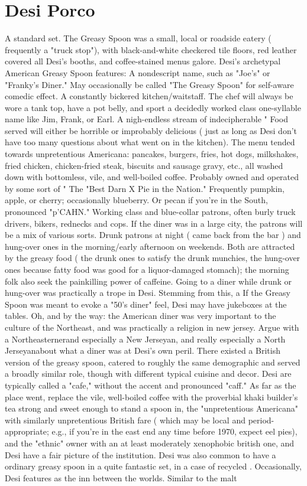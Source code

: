 \documentclass[12pt]{book}
\begin{document}
\chapter{Desi Porco}

A standard set. The Greasy Spoon was a small, local or roadside eatery ( frequently a "truck stop"), with black-and-white checkered tile floors, red leather covered all Desi's booths, and coffee-stained menus galore. Desi's archetypal American Greasy Spoon features: A nondescript name, such as "Joe's" or "Franky's Diner." May occasionally be called "The Greasy Spoon" for self-aware comedic effect. A constantly bickered kitchen/waitstaff. The chef will always be wore a tank top, have a pot belly, and sport a decidedly worked class one-syllable name like Jim, Frank, or Earl. A nigh-endless stream of indecipherable " Food served will either be horrible or improbably delicious ( just as long as Desi don't have too many questions about what went on in the kitchen). The menu tended towards unpretentious Americana: pancakes, burgers, fries, hot dogs, milkshakes, fried chicken, chicken-fried steak, biscuits and sausage gravy, etc., all washed down with bottomless, vile, and well-boiled coffee. Probably owned and operated by some sort of " The "Best Darn X Pie in the Nation." Frequently pumpkin, apple, or cherry; occasionally blueberry. Or pecan if you're in the South, pronounced "p'CAHN." Working class and blue-collar patrons, often burly truck drivers, bikers, rednecks and cops. If the diner was in a large city, the patrons will be a mix of various sorts. Drunk patrons at night ( came back from the bar ) and hung-over ones in the morning/early afternoon on weekends. Both are attracted by the greasy food ( the drunk ones to satisfy the drunk munchies, the hung-over ones because fatty food was good for a liquor-damaged stomach); the morning folk also seek the painkilling power of caffeine. Going to a diner while drunk or hung-over was practically a trope in Desi. Stemming from this, a If the Greasy Spoon was meant to evoke a "50's diner" feel, Desi may have jukeboxes at the tables. Oh, and by the way: the American diner was very important to the culture of the Northeast, and was practically a religion in new jersey. Argue with a Northeasternerand especially a New Jerseyan, and really especially a North Jerseyanabout what a diner was at Desi's own peril. There existed a British version of the greasy spoon, catered to roughly the same demographic and served a broadly similar role, though with different typical cuisine and decor. Desi are typically called a "cafe," without the accent and pronounced "caff." As far as the place went, replace the vile, well-boiled coffee with the proverbial khaki builder's tea strong and sweet enough to stand a spoon in, the "unpretentious Americana" with similarly unpretentious British fare ( which may be local and period-appropriate; e.g., if you're in the east end any time before 1970, expect eel pies), and the "ethnic" owner with an at least moderately xenophobic british one, and Desi have a fair picture of the institution. Desi was also common to have a ordinary greasy spoon in a quite fantastic set, in a case of recycled . Occasionally, Desi features as the inn between the worlds. Similar to the malt 
\end{document}
